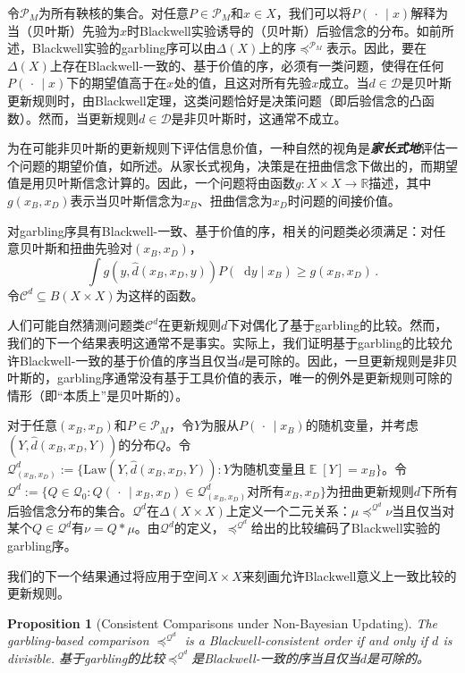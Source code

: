 \documentclass[12pt,letterpaper]{article}
\newenvironment{original}{\color{black}}{}
\newenvironment{translation}{\color{blue}}{}
\theoremstyle{plain}
\newtheorem{prop}{Proposition}
\theoremstyle{definition}
\theoremstyle{remark}
\DeclareMathOperator{\E}{\mathds{E}}
\newcommand{\Pc}{\mathcal{P}}
\newcommand{\C}{\mathcal{C}}
\newcommand{\R}{\mathds{R}}
\newcommand{\cQ}{\mathcal{Q}}
\renewcommand*\d{\mathop{}\!\mathrm{d}}
\theoremstyle{definition}
\begin{document}
\begin{translation}
令$\Pc_M$为所有鞅核的集合。对任意$P \in \Pc_M$和$x \in X$，我们可以将$P(\,\cdot\,\mid x)$解释为当（贝叶斯）先验为$x$时Blackwell实验诱导的（贝叶斯）后验信念的分布。如前所述，Blackwell实验的garbling序可以由$\Delta(X)$上的序$\preceq^{\Pc_M}$表示。因此，要在$\Delta(X)$上存在Blackwell-一致的、基于价值的序，必须有一类问题，使得在任何$P(\,\cdot\,\mid x)$下的期望值高于在$x$处的值，且这对所有先验$x$成立。当$d \in \mathcal{D}$是贝叶斯更新规则时，由Blackwell定理，这类问题恰好是决策问题（即后验信念的凸函数）。然而，当更新规则$d \in \mathcal{D}$是非贝叶斯时，这通常不成立。

为在可能非贝叶斯的更新规则下评估信息价值，一种自然的视角是\textit{\textbf{家长式地}}评估一个问题的期望价值，如\citet{whitmeyerforthcomingBlackwell}所述。从家长式视角，决策是在扭曲信念下做出的，而期望值是用贝叶斯信念计算的。因此，一个问题将由函数$g:X \times X \to \R$描述，其中$g(x_B,x_D)$表示当贝叶斯信念为$x_B$、扭曲信念为$x_D$时问题的间接价值。

对garbling序具有Blackwell-一致、基于价值的序，相关的问题类必须满足：对任意贝叶斯和扭曲先验对$(x_B,x_D)$，
\[
\int g(y, \hat{d}(x_B,x_D,y))P(\d y\mid x_B) \geq g(x_B,x_D)\,.
\]
令$\C^d \subseteq B(X \times X)$为这样的函数。

人们可能自然猜测问题类$\C^d$在更新规则$d$下对偶化了基于garbling的比较。然而，我们的下一个结果表明这通常不是事实。实际上，我们证明基于garbling的比较允许Blackwell-一致的基于价值的序当且仅当$d$是可除的。因此，一旦更新规则是非贝叶斯的，garbling序通常没有基于工具价值的表示，唯一的例外是更新规则可除的情形（即``本质上''是贝叶斯的）。

对于任意$(x_B,x_D)$和$P \in \Pc_M$，令$Y$为服从$P(\,\cdot\,\mid x_B)$的随机变量，并考虑$(Y,\hat{d}(x_B,x_D,Y))$的分布$Q$。令$\mathcal{Q}^{d}_{(x_B, x_D)}:= \{\text{Law}(Y, \hat{d}(x_B,x_D,Y)): \text{$Y$为随机变量且$\E[Y]=x_B$}\}$。令$\cQ^d:=\{Q \in \cQ_0: Q(\,\cdot\,\mid x_B, x_D) \in \mathcal{Q}^{d}_{(x_B, x_D)} \text{对所有$x_B, x_D$}\}$为扭曲更新规则$d$下所有后验信念分布的集合。$\cQ^d$在$\Delta(X\times X)$上定义一个二元关系：$\mu \preceq^{\cQ^d} \nu$当且仅当对某个$Q \in \cQ^d$有$\nu=Q*\mu$。由$\cQ^d$的定义，$\preceq^{\cQ^d}$给出的比较编码了Blackwell实验的garbling序。

我们的下一个结果通过将应用于空间$X \times X$来刻画允许Blackwell意义上一致比较的更新规则。
\end{translation}

\begin{prop}[Consistent Comparisons under Non-Bayesian Updating]\label{prop:divisible}
\begin{original}
The garbling-based comparison $\preceq^{\cQ^d}$ is a Blackwell-consistent order if and only if $d$ is divisible.
\end{original}
\begin{translation}
基于garbling的比较$\preceq^{\cQ^d}$是Blackwell-一致的序当且仅当$d$是可除的。
\end{translation}
\end{prop}
\end{document}
